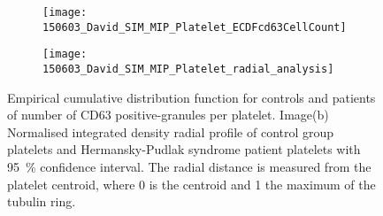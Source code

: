 \begin{figure}[htbp]{}
	\centering
	\begin{subfigure}[b]{0.72\linewidth}
		\texttt{[image: 150603\_David\_SIM\_MIP\_Platelet\_ECDFcd63CellCount]}
		\caption{}
		\label{figure:platelets:results:count_ecdf}
	\end{subfigure}
	\begin{subfigure}[b]{0.74\linewidth}
		\texttt{[image: 150603\_David\_SIM\_MIP\_Platelet\_radial\_analysis]}
		\caption{}
		\label{figure:platelets:results:radial_analysis}
	\end{subfigure}
\caption[Platelets results]{Empirical cumulative distribution function for controls and patients of number of CD63 positive-granules per platelet. Image(b) Normalised integrated density radial profile of control group platelets and Hermansky-Pudlak syndrome patient platelets with \SI{95}{\percent} confidence interval. The radial distance is measured from the platelet centroid, where 0 is the centroid and 1 the maximum of the tubulin ring.}
\label{figure:platelets:results}
\end{figure}
